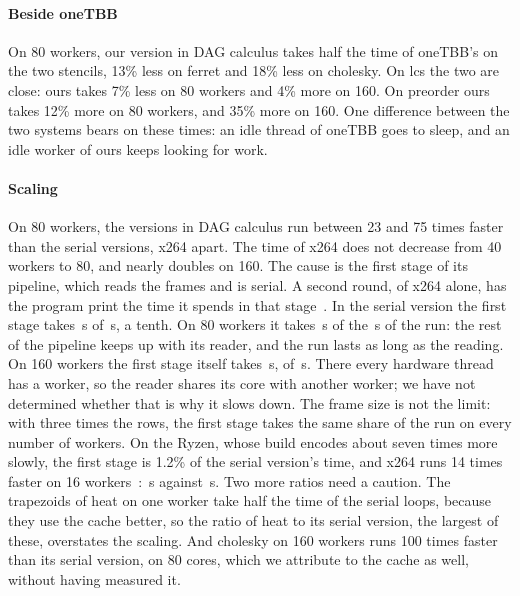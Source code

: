\documentclass[sigplan,nonacm]{acmart}
\begin{document}
\paragraph{Beside oneTBB}
%
On 80 workers, our version in DAG calculus takes half the time of
oneTBB's on the two stencils, 13\% less on ferret and 18\% less on
cholesky.
%
On lcs the two are close: ours takes 7\% less on 80 workers and 4\%
more on 160.
%
On preorder ours takes 12\% more on 80 workers, and 35\% more on 160.
%
One difference between the two systems bears on these times: an idle
thread of oneTBB goes to sleep, and an idle worker of ours keeps
looking for work.

\paragraph{Scaling}
%
On 80 workers, the versions in DAG calculus run between 23 and 75
times faster than the serial versions, x264 apart.
%
The time of x264 does not decrease from 40 workers to 80, and nearly
doubles on 160.
%
The cause is the first stage of its pipeline, which reads the frames
and is serial.
%
A second round, of x264 alone, has the program print the time it
spends in that stage~\cite{flexibench-dag-x264-icelake}.
%
In the serial version the first stage takes \,s of
\,s, a tenth.
%
On 80 workers it takes \,s of the
\,s of the run: the rest of the pipeline keeps up with
its reader, and the run lasts as long as the reading.
%
On 160 workers the first stage itself takes \,s,
of \,s.
%
There every hardware thread has a worker, so the reader shares its core
with another worker; we have not determined whether that is why it
slows down.
%
The frame size is not the limit: with three times the rows, the first
stage takes the same share of the run on every number of workers.
%
On the Ryzen, whose build encodes about seven times more slowly, the
first stage is 1.2\% of the serial version's time, and x264 runs 14
times faster on 16 workers~\cite{flexibench-dag-x264-gamora}:
\,s against \,s.
%
Two more ratios need a caution.
%
The trapezoids of heat on one worker take half the time of the serial
loops, because they use the cache better, so the ratio of heat to its
serial version, the largest of these, overstates the scaling.
%
And cholesky on 160 workers runs 100 times faster than its serial
version, on 80 cores, which we attribute to the cache as well, without
having measured it.
\end{document}
